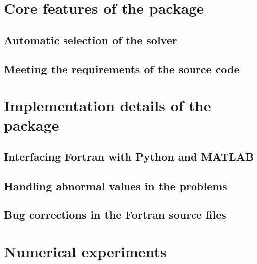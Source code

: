 \section{Core features of the  package}

\subsection{Automatic selection of the solver}
\label{subsec:solver-selection}

\subsection{Meeting the requirements of the source code}

\section{Implementation details of the  package}

\subsection{Interfacing Fortran with Python and MATLAB}

\subsection{Handling abnormal values in the problems}
\label{subsec:abnormal-values}

\subsection{Bug corrections in the Fortran source files}
\label{subsec:bug-corrections}

\section{Numerical experiments}
\label{sec:pdfo-experiments}
